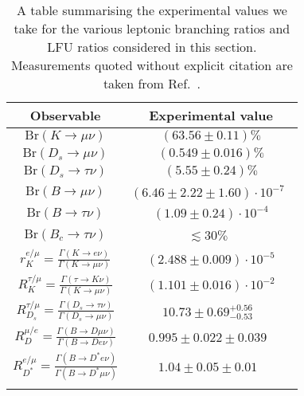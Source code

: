 \begin{table}[t]
  \centering
  \begin{tabular}{cc}
    \toprule
    Observable & Experimental value \\
    \midrule
    $\text{Br}(K\to\mu\nu)$       & $(63.56 \pm 0.11) \%$  \\
    $\text{Br}(D_s \to \mu \nu)$  & $(0.549 \pm 0.016) \%$ \\
    $\text{Br}(D_s \to \tau \nu)$ & $(5.55 \pm 0.24) \%$   \\
    $\text{Br}(B \to \mu \nu)$    & $(6.46 \pm 2.22 \pm 1.60) \cdot 10^{-7}$~\cite{Sibidanov:2017vph}  \\
    $\text{Br}(B \to \tau \nu)$   & $(1.09 \pm 0.24) \cdot 10^{-4}$ \\
    $\text{Br}(B_c \to \tau \nu)$   & $\lesssim 30 \%$~\cite{Alonso:2016oyd} \\
    \arrayrulecolor{black!30}\midrule
    $r_K^{e/\mu} = \frac{\Gamma(K \to e\nu)}{\Gamma(K\to \mu\nu)}$ & $(2.488 \pm 0.009) \cdot 10^{-5}$\\
    $R_{K}^{\tau/\mu} = \frac{\Gamma(\tau \to K\nu)}{\Gamma(K\to \mu\nu)}$ & $(1.101 \pm 0.016) \cdot 10^{-2}$\\
    $R_{D_s}^{\tau/\mu} = \frac{\Gamma(D_s \to \tau\nu)}{\Gamma(D_s\to \mu\nu)}$ & $10.73 \pm 0.69^{+0.56}_{-0.53}$~\cite{Zupanc:2013byn}\\
    $R_D^{\mu/e} = \frac{\Gamma(B \to D \mu \nu)}{\Gamma(B \to D e \nu)}$ & $0.995 \pm 0.022 \pm
0.039$~\cite{Glattauer:2015teq}\\
    $R_{D^*}^{e/\mu} = \frac{\Gamma(B \to D^* e \nu)}{\Gamma(B \to D^* \mu \nu)}$ & $1.04 \pm 0.05 \pm 0.01$~\cite{Abdesselam:2017kjf}\\
    \arrayrulecolor{black!100}\bottomrule
  \end{tabular}
  \caption[A table summarising the experimental values we take for the various
  leptonic branching ratios and LFU ratios considered in this section.]{A table
    summarising the experimental values we take for the various leptonic
    branching ratios and LFU ratios considered in this section. Measurements
    quoted without explicit citation are taken from Ref.~\cite{Olive:2016xmw}.}
    \label{tbl:ch3-decays}
\end{table}

